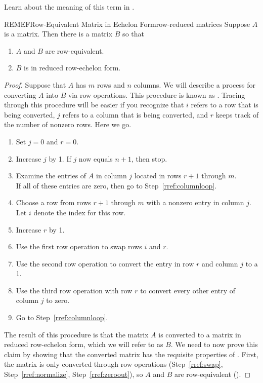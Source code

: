 {Learn about the meaning of this term in .}
%
\begin{theorem}{REMEF}{Row-Equivalent Matrix in Echelon Form}{row-reduced matrices}
Suppose $A$ is a matrix.  Then there is a matrix $B$ so that
\begin{enumerate}
\item $A$ and $B$ are row-equivalent.
\item $B$ is in reduced row-echelon form.
\end{enumerate}
\end{theorem}
%
\begin{proof}
Suppose that $A$ has $m$ rows and $n$ columns.  We will describe a process for converting $A$ into $B$ via row operations.  This procedure is known as .  Tracing through this procedure will be easier if you recognize that $i$ refers to a row that is being converted, $j$ refers to a column that is being converted, and $r$ keeps track of the number of nonzero rows.  Here we go.\par
%
\begin{enumerate}
%
\item\label{rref:initialize}
Set $j=0$ and $r=0$.
%
\item\label{rref:columnloop}
Increase $j$ by 1.  If $j$ now equals $n+1$, then stop.
%
\item\label{rref:locate}
Examine the entries of $A$ in column $j$ located in rows $r+1$ through $m$.\\
If all of these entries are zero, then go to Step~\ref{rref:columnloop}.
%
\item\label{rref:rowchoice}
Choose a row from rows $r+1$ through $m$ with a nonzero entry in column $j$.\\
Let $i$ denote the index for this row.
%
\item\label{rref:incrementrank}
Increase $r$ by 1.
%
\item\label{rref:swap}
Use the first row operation to swap rows $i$ and $r$.
%
\item\label{rref:normalize}
Use the second row operation to convert the entry in row $r$ and column $j$ to a 1.
%
\item\label{rref:zeroout}
Use the third row operation with row $r$ to convert every other entry of column $j$ to zero.
%
\item\label{rref:columnloopreturn}
Go to Step~\ref{rref:columnloop}.
%
\end{enumerate}
%
The result of this procedure is that the matrix $A$ is converted to a matrix in reduced row-echelon form, which we will refer to as $B$.  We need to now prove this claim by showing that the converted matrix has the requisite properties of .  First, the matrix is only converted through row operations (Step~\ref{rref:swap}, Step~\ref{rref:normalize}, Step~\ref{rref:zeroout}), so $A$ and $B$ are row-equivalent ().\par

\end{proof}
